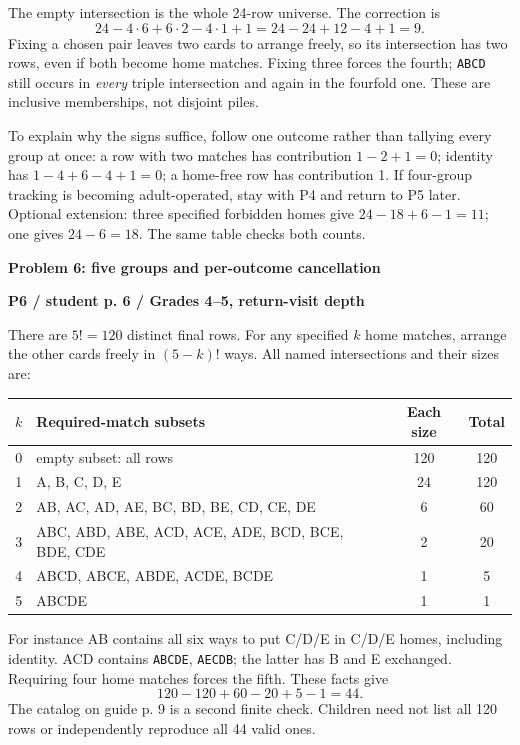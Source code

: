 \documentclass[11pt]{article}
\newcommand{\heading}[1]{\par\textbf{\large #1}\par}
\newcommand{\subhead}[1]{\par\textbf{#1}\par}
\newcommand{\row}[1]{\texttt{#1}}
\newcommand{\guidepage}{\newpage}
\begin{document}
The empty intersection is the whole 24-row universe. The correction is
\[
24-4\cdot6+6\cdot2-4\cdot1+1=24-24+12-4+1=\boxed9.
\]
Fixing a chosen pair leaves two cards to arrange freely, so its intersection has two rows, even if both become home matches. Fixing three forces the fourth; \row{ABCD} still occurs in \emph{every} triple intersection and again in the fourfold one. These are inclusive memberships, not disjoint piles.

To explain why the signs suffice, follow one outcome rather than tallying every group at once: a row with two matches has contribution $1-2+1=0$; identity has $1-4+6-4+1=0$; a home-free row has contribution 1. If four-group tracking is becoming adult-operated, stay with P4 and return to P5 later. Optional extension: three specified forbidden homes give $24-18+6-1=11$; one gives $24-6=18$. The same table checks both counts.

\guidepage
\heading{Problem 6: five groups and per-outcome cancellation}
\subhead{P6 / student p. 6 / Grades 4--5, return-visit depth}
There are $5!=120$ distinct final rows. For any specified $k$ home matches, arrange the other cards freely in $(5-k)!$ ways. All named intersections and their sizes are:

\begin{center}\begin{tabularx}{\linewidth}{@{}cXcc@{}}\toprule
$k$ & Required-match subsets & Each size & Total\\\midrule
0 & empty subset: all rows &120&120\\
1 & A, B, C, D, E &24&120\\
2 & AB, AC, AD, AE, BC, BD, BE, CD, CE, DE &6&60\\
3 & ABC, ABD, ABE, ACD, ACE, ADE, BCD, BCE, BDE, CDE &2&20\\
4 & ABCD, ABCE, ABDE, ACDE, BCDE &1&5\\
5 & ABCDE &1&1\\\bottomrule
\end{tabularx}\end{center}

For instance AB contains all six ways to put C/D/E in C/D/E homes, including identity. ACD contains \row{ABCDE}, \row{AECDB}; the latter has B and E exchanged. Requiring four home matches forces the fifth. These facts give
\[
120-120+60-20+5-1=\boxed{44}.
\]
The catalog on guide p. 9 is a second finite check. Children need not list all 120 rows or independently reproduce all 44 valid ones.
\end{document}
